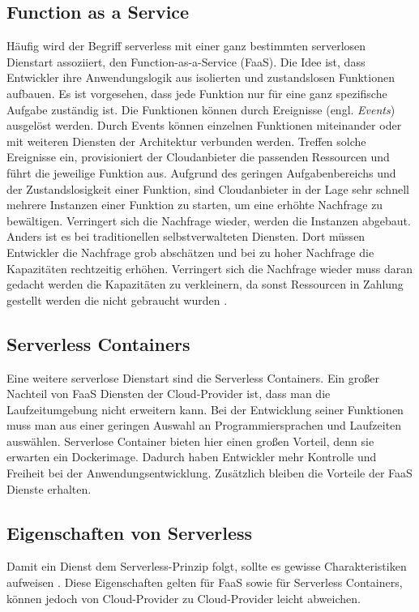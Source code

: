 \subsection{Function as a Service}
Häufig wird der Begriff serverless mit einer ganz bestimmten serverlosen Dienstart
assoziiert, den Function-as-a-Service (FaaS).
Die Idee ist, dass Entwickler ihre Anwendungslogik aus isolierten und 
zustandslosen Funktionen aufbauen.
Es ist vorgesehen, dass jede Funktion nur für eine
ganz spezifische Aufgabe zuständig ist. Die Funktionen können
durch Ereignisse (engl. \emph{Events}) ausgelöst werden.
Durch Events können einzelnen Funktionen miteinander oder mit
weiteren Diensten der Architektur verbunden werden. 
Treffen solche Ereignisse ein, provisioniert der
Cloudanbieter die passenden Ressourcen und führt die jeweilige Funktion aus.
Aufgrund des geringen Aufgabenbereichs und der Zustandslosigkeit einer Funktion,
sind Cloudanbieter in der Lage sehr schnell mehrere Instanzen einer Funktion zu starten,
um eine erhöhte Nachfrage zu bewältigen.
Verringert sich die Nachfrage wieder, werden die Instanzen abgebaut. Anders ist 
es bei traditionellen selbstverwalteten Diensten. Dort müssen Entwickler die Nachfrage grob
abschätzen und bei zu hoher Nachfrage die Kapazitäten rechtzeitig
erhöhen. Verringert sich die Nachfrage wieder muss daran
gedacht werden die Kapazitäten zu verkleinern, da sonst
Ressourcen in Zahlung gestellt werden die nicht gebraucht wurden
\cite{WhatIsServerless} \cite{ServerlessTrends}.

\subsection{Serverless Containers}
Eine weitere serverlose Dienstart sind die Serverless Containers.
Ein großer Nachteil von FaaS Diensten der Cloud-Provider ist,
dass man die Laufzeitumgebung nicht erweitern kann. Bei der
Entwicklung seiner Funktionen muss man aus einer geringen Auswahl
an Programmiersprachen und Laufzeiten auswählen. Serverlose Container
bieten hier einen großen Vorteil, denn sie erwarten ein Dockerimage.
Dadurch haben Entwickler mehr Kontrolle und Freiheit bei der
Anwendungsentwicklung. Zusätzlich bleiben 
die Vorteile der FaaS Dienste erhalten.

\subsection{Eigenschaften von Serverless}
Damit ein Dienst dem Serverless-Prinzip folgt, sollte es
gewisse Charakteristiken aufweisen \cite{ShafKhonMou}. Diese Eigenschaften gelten
für FaaS sowie für Serverless Containers, können jedoch von Cloud-Provider zu
Cloud-Provider leicht abweichen.

